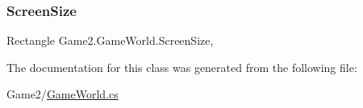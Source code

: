 \mbox{\label{class_game2_1_1_game_world_a33e4b367438dde0cb88d9fab8439c0e5}} 
\subsubsection{\texorpdfstring{Screen\+Size}{ScreenSize}}
{\footnotesize\ttfamily Rectangle Game2.\+Game\+World.\+Screen\+Size\hspace{0.3cm}{\ttfamily [static]}, {\ttfamily [get]}}



The documentation for this class was generated from the following file\+:\begin{DoxyCompactItemize}
\item 
Game2/\mbox{\hyperlink{_game_world_8cs}{Game\+World.\+cs}}\end{DoxyCompactItemize}
